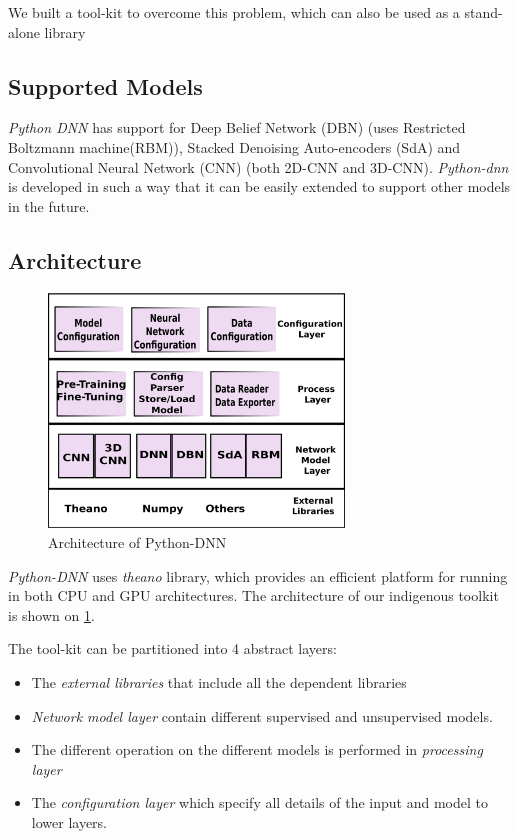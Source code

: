 We built a tool-kit to overcome this problem, which can also be used as a stand-alone library


\subsection{Supported Models}
\label{sec:python-dnnModels}
\textit{Python DNN}  has support  for Deep Belief Network (DBN) \cite{hinton2002training} (uses Restricted Boltzmann machine(RBM)), Stacked Denoising Auto-encoders (SdA) \cite{vincent2010stacked} and Convolutional Neural Network (CNN) \cite{lecun1998gradient} (both 2D-CNN and 3D-CNN). \textit{Python-dnn} is developed in such a way that it can be easily extended to support other models in the future.

\subsection{Architecture}

\begin{figure}[ht]
\centering
\includegraphics[width=0.7\textwidth]{./imgs/Python-DNNArch.eps}
\caption{Architecture of Python-DNN}
\label{fig:pydnn-arch}
\end{figure}

\textit{Python-DNN} uses \emph{theano} library, which provides an efficient platform for running in both CPU and GPU architectures. The architecture of our indigenous toolkit is shown on \ref{fig:pydnn-arch}. 

\noindent The tool-kit can be partitioned into 4 abstract layers:
\begin{itemize}
\item The \textit{external libraries} that include all the dependent libraries
\item \textit{Network model layer} contain different supervised and unsupervised models.
\item The different operation on the different models is performed in \textit{processing layer}
\item The \textit{configuration layer} which specify all details of the input and model to lower layers.
\end{itemize}

